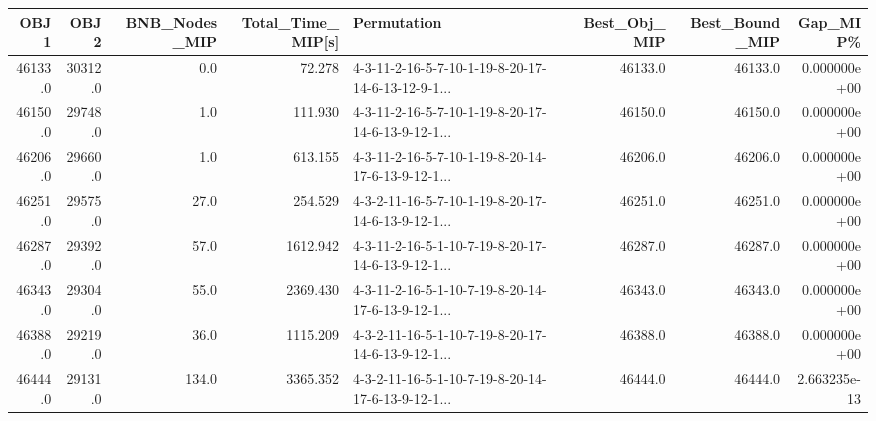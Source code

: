 \begin{tabular}{rrrrlrrr}
\toprule
    OBJ1 &     OBJ2 &  BNB\_Nodes\_MIP &  Total\_Time\_MIP[s] &                                        Permutation &  Best\_Obj\_MIP &  Best\_Bound\_MIP &      Gap\_MIP\% \\
\midrule
 46133.0 &  30312.0 &            0.0 &             72.278 &  4-3-11-2-16-5-7-10-1-19-8-20-17-14-6-13-12-9-1... &       46133.0 &         46133.0 &  0.000000e+00 \\
 46150.0 &  29748.0 &            1.0 &            111.930 &  4-3-11-2-16-5-7-10-1-19-8-20-17-14-6-13-9-12-1... &       46150.0 &         46150.0 &  0.000000e+00 \\
 46206.0 &  29660.0 &            1.0 &            613.155 &  4-3-11-2-16-5-7-10-1-19-8-20-14-17-6-13-9-12-1... &       46206.0 &         46206.0 &  0.000000e+00 \\
 46251.0 &  29575.0 &           27.0 &            254.529 &  4-3-2-11-16-5-7-10-1-19-8-20-17-14-6-13-9-12-1... &       46251.0 &         46251.0 &  0.000000e+00 \\
 46287.0 &  29392.0 &           57.0 &           1612.942 &  4-3-11-2-16-5-1-10-7-19-8-20-17-14-6-13-9-12-1... &       46287.0 &         46287.0 &  0.000000e+00 \\
 46343.0 &  29304.0 &           55.0 &           2369.430 &  4-3-11-2-16-5-1-10-7-19-8-20-14-17-6-13-9-12-1... &       46343.0 &         46343.0 &  0.000000e+00 \\
 46388.0 &  29219.0 &           36.0 &           1115.209 &  4-3-2-11-16-5-1-10-7-19-8-20-17-14-6-13-9-12-1... &       46388.0 &         46388.0 &  0.000000e+00 \\
 46444.0 &  29131.0 &          134.0 &           3365.352 &  4-3-2-11-16-5-1-10-7-19-8-20-14-17-6-13-9-12-1... &       46444.0 &         46444.0 &  2.663235e-13 \\
\bottomrule
\end{tabular}
